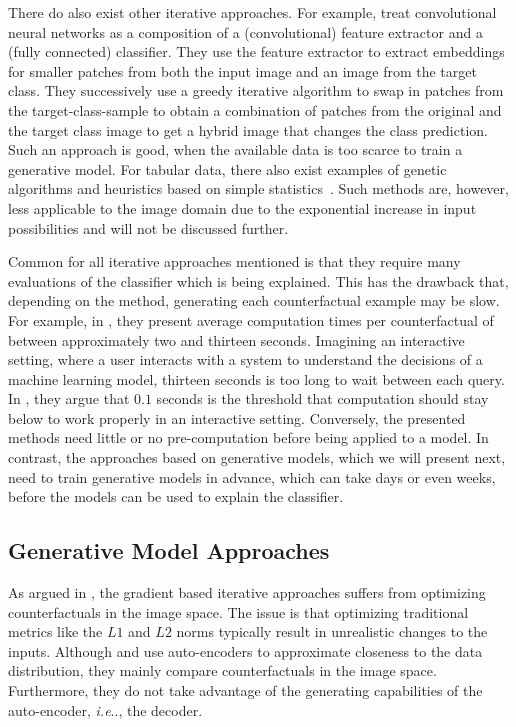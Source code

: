 \documentclass[11pt,a4paper,twoside,openright,final]{memoir}
\makeatletter
\DeclareRobustCommand\onedot{\futurelet\@let@token\@onedot}
\def\@onedot{\ifx\@let@token.\else.\null\fi\xspace}
\def\ie{\emph{i.e}\onedot} \def\Ie{\emph{I.e}\onedot}
\makeatother
\begin{document}
There do also exist other iterative approaches.
For example, \citet{goyal19a} treat convolutional neural networks as a composition of a (convolutional) feature extractor and a (fully connected) classifier.
They use the feature extractor to extract embeddings for smaller patches from both the input image and an image from the target class. 
They successively use a greedy iterative algorithm to swap in patches from the target-class-sample to obtain a combination of patches from the original and the target class image to get a hybrid image that changes the class prediction.
Such an approach is good, when the available data is too scarce to train a generative model. 
For tabular data, there also exist examples of genetic algorithms \cite{Hashemi2020} and heuristics based on simple statistics~\cite{Gomez2020}.
Such methods are, however, less applicable to the image domain due to the exponential increase in input possibilities and will not be discussed further. 

Common for all iterative approaches mentioned is that they require many evaluations of the classifier which is being explained.
This has the drawback that, depending on the method, generating each counterfactual example may be slow.
For example, in \cite{VanLooveren2019}, they present average computation times per counterfactual of between approximately two and thirteen seconds.
Imagining an interactive setting, where a user interacts with a system to understand the decisions of a machine learning model, thirteen seconds is too long to wait between each query.
In \cite{card1991information}, they argue that $0.1$ seconds is the threshold that computation should stay below to work properly in an interactive setting.
Conversely, the presented methods need little or no pre-computation before being applied to a model.
In contrast, the approaches based on generative models, which we will present next, need to train generative models in advance, which can take days or even weeks, before the models can be used to explain the classifier.

\subsection{Generative Model Approaches} 

As argued in \cite{Rodriguez2021}, the gradient based iterative approaches suffers from optimizing counterfactuals in the image space.
The issue is that optimizing traditional metrics like the $L1$ and $L2$ norms typically result in unrealistic changes to the inputs. 
Although \cite{Dhurandhar2018} and \cite{VanLooveren2019} use auto-encoders to approximate closeness to the data distribution, they mainly compare counterfactuals in the image space.
Furthermore, they do not take advantage of the generating capabilities of the auto-encoder, \ie, the decoder. 
\end{document}
